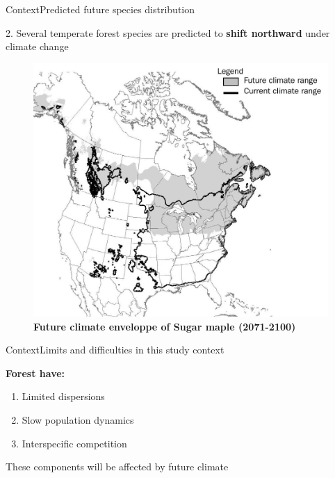 \documentclass[10pt,aspectratio=149]{beamer}
\begin{document}
\begin{frame}[t]{Context}{Predicted future species distribution}

2. Several temperate forest species are predicted to \textbf{shift northward} under climate change
	

	\begin{figure}
		\includegraphics[width=.40\paperwidth]{Figs/sugar_map_distrib.jpg}
	\caption{ \textbf{Future climate enveloppe of Sugar maple (2071-2100)}}
	\end{figure}



\end{frame}



\begin{frame}{Context}{Limits and difficulties in this study context}

\textbf{Forest have:}
		\begin{enumerate}
			\item Limited dispersions
			\item Slow population dynamics
			\item Interspecific competition
		\end{enumerate}
\vspace{1em}
	\pause
	\alert{These components will be affected by future climate}
\end{frame}
\end{document}
